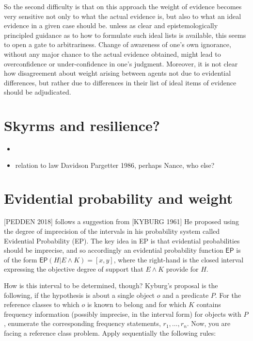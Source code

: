 \documentclass[
  10pt,
  dvipsnames,enabledeprecatedfontcommands]{scrartcl}
\providecommand{\tightlist}{%
  \setlength{\itemsep}{0pt}\setlength{\parskip}{0pt}}
\begin{document}
So the second difficulty is that on this approach the weight of evidence
becomes very sensitive not only to what the actual evidence is, but also
to what an ideal evidence in a given case should be. unless as clear and
epistemologically principled guidance as to how to formulate such ideal
lists is available, this seems to open a gate to arbitrariness. Change
of awareness of one's own ignorance, without any major chance to the
actual evidence obtained, might lead to overconfidence or
under-confidence in one's judgment. Moreover, it is not clear how
disagreement about weight arising between agents not due to evidential
differences, but rather due to differences in their list of ideal items
of evidence should be adjudicated.

\hypertarget{skyrms-and-resilience}{%
\section{Skyrms and resilience?}\label{skyrms-and-resilience}}

\begin{itemize}
\tightlist
\item
\item
  relation to law Davidson Pargetter 1986, perhaps Nance, who else?
\end{itemize}

\hypertarget{evidential-probability-and-weight}{%
\section{Evidential probability and
weight}\label{evidential-probability-and-weight}}

{[}PEDDEN 2018{]}  follows a suggestion from {[}KYBURG
1961{]}
He proposed using the degree of imprecision of the intervals in his
probability system called Evidential Probability (EP). The key idea in
EP is that evidential probabilities should be imprecise, and so
accordingly an evidential probability function \(\mathsf{EP}\) is of the
form \(\mathsf{EP}(H \vert E \wedge K) = [x,y]\), where the right-hand
is the closed interval expressing the objective degree of support that
\(E\wedge K\) provide for \(H\).

How is this interval to be determined, though? Kyburg's proposal is the
following, if the hypothesis is about a single object \(o\) and a
predicate \(P\). For the reference classes to which \(o\) is known to
belong and for which \(K\) contains frequency information (possibly
imprecise, in the interval form) for objects with \(P\), enumerate the
corresponding frequency statements, \(r_1, \dots, r_n\). Now, you are
facing a reference class problem. Apply sequentially the following
rules:
\end{document}
